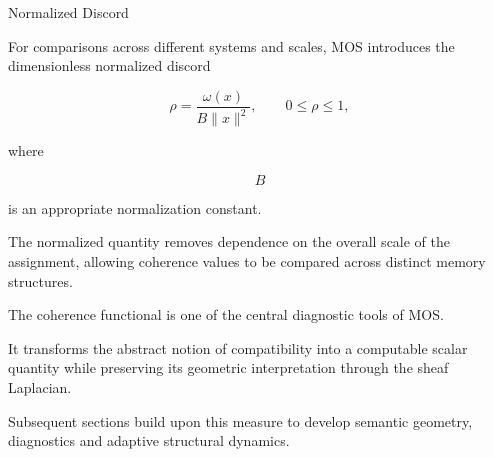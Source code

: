 
\begin{mosbox}{Normalized Discord}

\BodyFont

For comparisons across different systems and scales, MOS introduces the
dimensionless normalized discord

\[
\boxed{
\rho
=
\frac{\omega(x)}
{B\|x\|^{2}},
\qquad
0\le\rho\le1,
}
\]

where

\[
B
\]

is an appropriate normalization constant.

The normalized quantity removes dependence on the overall scale of the
assignment, allowing coherence values to be compared across distinct
memory structures.

\end{mosbox}


\begin{center}


\end{center}


\begin{remarkbox}

\BodyFont

The coherence functional is one of the central diagnostic tools of MOS.

It transforms the abstract notion of compatibility into a computable scalar
quantity while preserving its geometric interpretation through the sheaf
Laplacian.

Subsequent sections build upon this measure to develop semantic geometry,
diagnostics and adaptive structural dynamics.

\end{remarkbox}